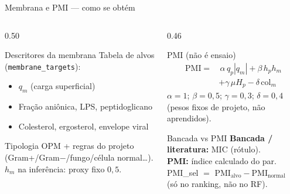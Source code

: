 \documentclass[aspectratio=169,10pt]{beamer}
\begin{document}
\begin{frame}{Membrana e PMI --- como se obtém}
\begin{columns}[T]
\begin{column}{0.50\textwidth}
\begin{block}{Descritores da membrana}
Tabela de alvos (\texttt{membrane\_targets}):
\begin{itemize}
  \item $q_m$ (carga superficial)
  \item Fração aniônica, LPS, peptidoglicano
  \item Colesterol, ergosterol, envelope viral
\end{itemize}
{\scriptsize Tipologia OPM + regras do projeto\\
(Gram+/Gram$-$/fungo/célula normal\ldots).\\
$h_m$ na inferência: proxy fixo $0{,}5$.}
\end{block}
\end{column}
\begin{column}{0.46\textwidth}
\begin{block}{PMI (não é ensaio)}
\[
\begin{aligned}
\mathrm{PMI}=&\,\alpha\,q_p|q_m|+\beta\,h_p h_m\\
&+\gamma\,\mu H_p-\delta\,\mathrm{col}_m
\end{aligned}
\]
{\scriptsize $\alpha{=}1$; $\beta{=}0{,}5$; $\gamma{=}0{,}3$; $\delta{=}0{,}4$\\
(pesos fixos de projeto, não aprendidos).}
\end{block}
\vspace{0.15cm}
\begin{block}{Bancada vs PMI}
\textbf{Bancada / literatura:} MIC (rótulo).\\
\textbf{PMI:} índice calculado do par.\\
{\scriptsize PMI\_sel $=$ PMI$_{\mathrm{alvo}}-$PMI$_{\mathrm{normal}}$\\
(só no ranking, não no RF).}
\end{block}
\end{column}
\end{columns}
\end{frame}
\end{document}
